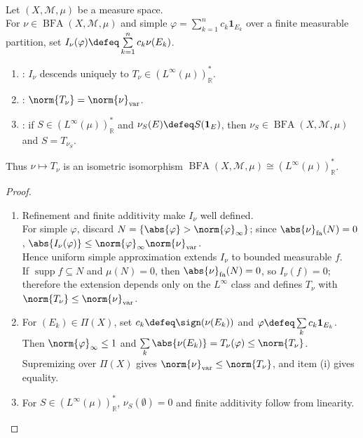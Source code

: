 \begin{theorem} \label{thm:kantorovitch-representation-linfty-dual} \\
Let $(X,\mathcal M,\mu)$ be a measure space.\\
For $\nu\in\operatorname{BFA}(X,\mathcal M,\mu)$ and simple $\varphi=\sum\limits_{k=1}^nc_k\mathbf 1_{E_k}$ over a finite measurable partition, set $I_\nu(\varphi)\defeq\sum\limits_{k=1}^nc_k\nu(E_k)$.
\begin{enumerate}[label=(\roman*)]
\setlength{\itemsep}{0pt}
\item {}: $I_\nu$ descends uniquely to $T_\nu\in(L^\infty(\mu))^*_\mathbb R$.
\item {}: $\norm{T_\nu}=\norm{\nu}_{\mathrm{var}}$.
\item {}: if $S\in(L^\infty(\mu))^*_\mathbb R$ and $\nu_S(E)\defeq S(\mathbf 1_E)$, then $\nu_S\in\operatorname{BFA}(X,\mathcal M,\mu)$ and $S=T_{\nu_S}$.
\end{enumerate}
Thus $\nu\mapsto T_\nu$ is an isometric isomorphism $\operatorname{BFA}(X,\mathcal M,\mu)\cong(L^\infty(\mu))^*_\mathbb R$.
\begin{proof}
\begin{enumerate}[label=(\roman*)]
\setlength{\itemsep}{0pt}
\item Refinement and finite additivity make $I_\nu$ well defined.\\
For simple $\varphi$, discard $N=\{\abs{\varphi}>\norm{\varphi}_\infty\}$; since $\abs{\nu}_{\mathrm{fa}}(N)=0$, $\abs{I_\nu(\varphi)}\leq\norm{\varphi}_\infty\norm{\nu}_{\mathrm{var}}$.\\
Hence uniform simple approximation extends $I_\nu$ to bounded measurable $f$.\\
If $\operatorname{supp}f\subseteq N$ and $\mu(N)=0$, then $\abs{\nu}_{\mathrm{fa}}(N)=0$, so $I_\nu(f)=0$; therefore the extension depends only on the $L^\infty$ class and defines $T_\nu$ with $\norm{T_\nu}\leq\norm{\nu}_{\mathrm{var}}$.
\item For $(E_k)\in\Pi(X)$, set $c_k\defeq\sign(\nu(E_k))$ and $\varphi\defeq\sum\limits_kc_k\mathbf 1_{E_k}$.\\
Then $\norm{\varphi}_\infty\leq1$ and $\sum\limits_k\abs{\nu(E_k)}=T_\nu(\varphi)\leq\norm{T_\nu}$.\\
Supremizing over $\Pi(X)$ gives $\norm{\nu}_{\mathrm{var}}\leq\norm{T_\nu}$, and item (i) gives equality.
\item For $S\in(L^\infty(\mu))^*_\mathbb R$, $\nu_S(\emptyset)=0$ and finite additivity follow from linearity.\\

\end{enumerate}
\end{proof}
\end{theorem}
